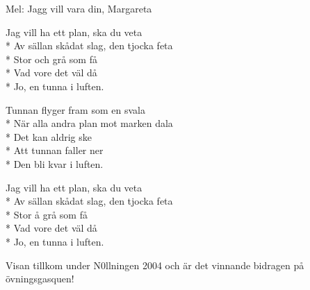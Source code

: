 \begin{SongText}
    \begin{SongInfo}
        Mel: Jagg vill vara din, Margareta
    \end{SongInfo}
    \begin{SongVerse}
        Jag vill ha ett plan, ska du veta\\*%
        Av sällan skådat slag, den tjocka feta\\*%
        Stor och grå som få\\*%
        Vad vore det väl då\\*%
        Jo, en tunna i luften.
    \end{SongVerse}
    \begin{SongVerse}
        Tunnan flyger fram som en svala\\*%
        När alla andra plan mot marken dala\\*%
        Det kan aldrig ske\\*%
        Att tunnan faller ner\\*%
        Den bli kvar i luften.
    \end{SongVerse}
    \begin{SongVerse}
        Jag vill ha ett plan, ska du veta\\*%
        Av sällan skådat slag, den tjocka feta\\*%
        Stor å grå som få\\*%
        Vad vore det väl då\\*%
        Jo, en tunna i luften.
    \end{SongVerse}
    \begin{SongInfo}
        Visan tillkom under N0llningen 2004 och är det vinnande bidragen på övningsgasquen!
    \end{SongInfo}
\end{SongText}
